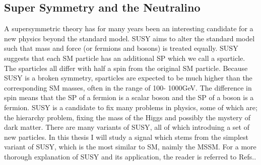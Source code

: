 \subsection{Super Symmetry and the Neutralino}\label{subsec:SS}
A supersymmetric theory has for many years been an interesting candidate for a new physics beyond the standard 
model. \ac{SUSY} aims to alter the standard model such that mass and force (or fermions and bosons) is treated equally. 
\ac{SUSY} suggests that each \ac{SM} particle has an additional \ac{SP} which we call a sparticle. 
The sparticles all differ with half a spin from the original \ac{SM} particle. Because \ac{SUSY} is a broken symmetry, 
sparticles are expected to be much higher than the corresponding \ac{SM} masses, often in the range of 100- 1000GeV. 
The difference in spin means that the \ac{SP} of a fermion is a scalar boson and the \ac{SP} of a boson is a fermion. \ac{SUSY} is a 
candidate to fix many problems in physics, some of which are; the hierarchy problem, fixing the mass of the Higgs 
and possibly the mystery of dark matter. There are many variants of \ac{SUSY}, all of which introduing a set of new 
particles. In this thesis I will study a signal which stems from the simplest variant of \ac{SUSY}, which is the most 
similar to \ac{SM}, naimly the \ac{MSSM}. For a more thorough explanation of \ac{SUSY} and its application, the 
reader is referred to Refs.\cite{SUSY}. 

